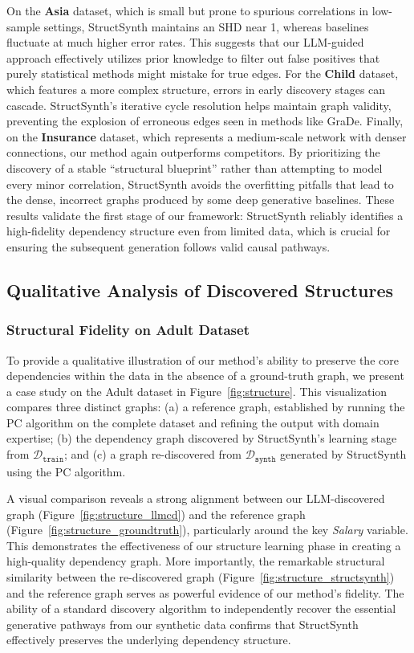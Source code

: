 On the \textbf{Asia} dataset, which is small but prone to spurious correlations in low-sample settings, \textsf{StructSynth} maintains an SHD near 1, whereas baselines fluctuate at much higher error rates. This suggests that our LLM-guided approach effectively utilizes prior knowledge to filter out false positives that purely statistical methods might mistake for true edges. For the \textbf{Child} dataset, which features a more complex structure, errors in early discovery stages can cascade. \textsf{StructSynth}'s iterative cycle resolution helps maintain graph validity, preventing the explosion of erroneous edges seen in methods like GraDe. Finally, on the \textbf{Insurance} dataset, which represents a medium-scale network with denser connections, our method again outperforms competitors. By prioritizing the discovery of a stable ``structural blueprint'' rather than attempting to model every minor correlation, \textsf{StructSynth} avoids the overfitting pitfalls that lead to the dense, incorrect graphs produced by some deep generative baselines. These results validate the first stage of our framework: \textsf{StructSynth} reliably identifies a high-fidelity dependency structure even from limited data, which is crucial for ensuring the subsequent generation follows valid causal pathways.


\subsection{Qualitative Analysis of Discovered Structures}
\label{sec:qualitative}

\subsubsection{Structural Fidelity on Adult Dataset}

To provide a qualitative illustration of our method's ability to preserve the core dependencies within the data in the absence of a ground-truth graph, we present a case study on the Adult dataset in Figure~\ref{fig:structure}. This visualization compares three distinct graphs: (a) a reference graph, established by running the PC algorithm on the complete dataset and refining the output with domain expertise; (b) the dependency graph discovered by \textsf{StructSynth}'s learning stage from $\mathcal{D}_\mathtt{train}$; and (c) a graph re-discovered from $\mathcal{D}_\mathtt{synth}$ generated by \textsf{StructSynth} using the PC algorithm.

A visual comparison reveals a strong alignment between our LLM-discovered graph (Figure~\ref{fig:structure_llmcd}) and the reference graph (Figure~\ref{fig:structure_groundtruth}), particularly around the key \textit{Salary} variable. This demonstrates the effectiveness of our structure learning phase in creating a high-quality dependency graph. More importantly, the remarkable structural similarity between the re-discovered graph (Figure~\ref{fig:structure_structsynth}) and the reference graph serves as powerful evidence of our method's fidelity. The ability of a standard discovery algorithm to independently recover the essential generative pathways from our synthetic data confirms that \textsf{StructSynth} effectively preserves the underlying dependency structure.

